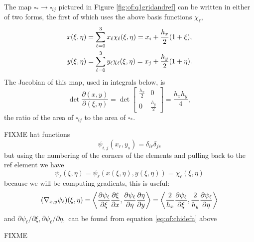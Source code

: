 The map $\square_\ast \to \square_{ij}$ pictured in Figure \ref{fig:of:q1gridandref} can be written in either of two forms, the first of which uses the above basis functions $\chi_\ell$,
\begin{align}
x(\xi,\eta) &= \sum_{\ell=0}^3 x_\ell \chi_\ell(\xi,\eta) = x_i + \frac{h_x}{2} (1+\xi), \label{eq:of:referencemap} \\
y(\xi,\eta) &= \sum_{\ell=0}^3 y_\ell \chi_\ell(\xi,\eta) = x_j + \frac{h_y}{2} (1+\eta). \notag
\end{align}
The Jacobian of this map, used in integrals below, is
\begin{equation}
\det\frac{\partial(x,y)}{\partial(\xi,\eta)} = \det\begin{bmatrix} \frac{h_x}{2} & 0 \\ 0 & \frac{h_y}{2} \end{bmatrix} = \frac{h_x h_y}{4}, \label{eq:of:elementjacobian}
\end{equation}
the ratio of the area of $\square_{ij}$ to the area of $\square_\ast$.

FIXME hat functions
\begin{equation}
  \psi_{i,j}(x_r,y_s) = \delta_{ir} \delta_{js}  \label{eq:of:phinodewise}
\end{equation}
but using the numbering of the corners of the elements and pulling back to the ref element we have
\begin{equation}
  \psi_\ell(\xi,\eta) = \psi_\ell(x(\xi,\eta),y(\xi,\eta)) = \chi_\ell(\xi,\eta)  \label{eq:of:phionref}
\end{equation}
because we will be computing gradients, this is useful:
\begin{equation}
  (\nabla_{x,y} \psi_\ell)(\xi,\eta) = \left<\frac{\partial\psi_\ell}{\partial \xi} \frac{\partial\xi}{\partial x},\frac{\partial\psi_\ell}{\partial \eta} \frac{\partial\eta}{\partial y}\right> = \left<\frac{2}{h_x}\frac{\partial\psi_\ell}{\partial \xi},\frac{2}{h_y}\frac{\partial\psi_\ell}{\partial \eta}\right>   \label{eq:of:gradphionref}
\end{equation}
and $\partial\psi_\ell/\partial \xi,\partial\psi_\ell/\partial \eta,$ can be found from equation \eqref{eq:of:chidefn} above

\begin{marginfigure}

\caption{FIXME}
\label{fig:of:q1hat}
\end{marginfigure}

